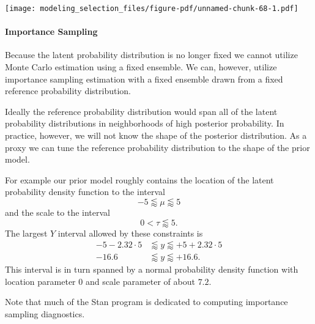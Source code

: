 \documentclass[
  letterpaper,
  DIV=11,
  numbers=noendperiod]{scrartcl}
\let\oldparagraph\paragraph
\renewcommand{\paragraph}[1]{\oldparagraph{#1}\mbox{}}
\begin{document}
\texttt{[image: modeling\_selection\_files/figure-pdf/unnamed-chunk-68-1.pdf]}

\paragraph{Importance Sampling}\label{importance-sampling}

Because the latent probability distribution is no longer fixed we cannot
utilize Monte Carlo estimation using a fixed ensemble. We can, however,
utilize importance sampling estimation with a fixed ensemble drawn from
a fixed reference probability distribution.

Ideally the reference probability distribution would span all of the
latent probability distributions in neighborhoods of high posterior
probability. In practice, however, we will not know the shape of the
posterior distribution. As a proxy we can tune the reference probability
distribution to the shape of the prior model.

For example our prior model roughly contains the location of the latent
probability density function to the interval \[
-5 \lessapprox \mu \lessapprox 5
\] and the scale to the interval \[
0 < \tau \lessapprox 5.
\] The largest \(Y\) interval allowed by these constraints is
\begin{align*}
-5 - 2.32 \cdot 5 &\lessapprox y \lessapprox +5 + 2.32 \cdot 5
\\
-16.6 &\lessapprox y \lessapprox +16.6.
\end{align*} This interval is in turn spanned by a normal probability
density function with location parameter \(0\) and scale parameter of
about \(7.2\).

Note that much of the Stan program is dedicated to computing importance
sampling diagnostics.
\end{document}
